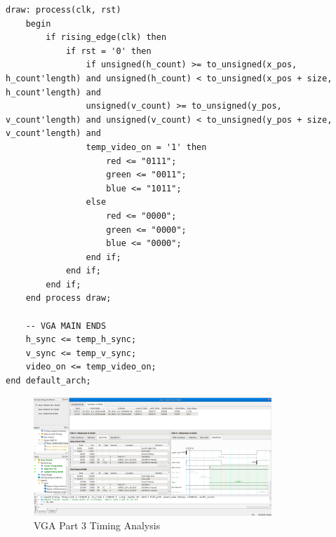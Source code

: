 \documentclass{article}
\begin{document}
\begin{lstlisting}[caption=VGA Entity for Part 3, label=lst:vga-entity-part-3]
	draw: process(clk, rst)
	begin
		if rising_edge(clk) then
			if rst = '0' then
				if unsigned(h_count) >= to_unsigned(x_pos, h_count'length) and unsigned(h_count) < to_unsigned(x_pos + size, h_count'length) and
                unsigned(v_count) >= to_unsigned(y_pos, v_count'length) and unsigned(v_count) < to_unsigned(y_pos + size, v_count'length) and
                temp_video_on = '1' then  
					red <= "0111";
					green <= "0011";
					blue <= "1011";
				else
					red <= "0000";
					green <= "0000";
					blue <= "0000";
				end if;
			end if;
		end if;
	end process draw;

	-- VGA MAIN ENDS
	h_sync <= temp_h_sync;
	v_sync <= temp_v_sync;
	video_on <= temp_video_on;
end default_arch;
\end{lstlisting}

\begin{figure}[H]
  \centering
  \label{fig:timing-analysis}
  \includegraphics[width=0.8\textwidth]{P4-Report-Timing-20ns.png}
  \caption{VGA Part 3 Timing Analysis}
\end{figure}
\end{document}
